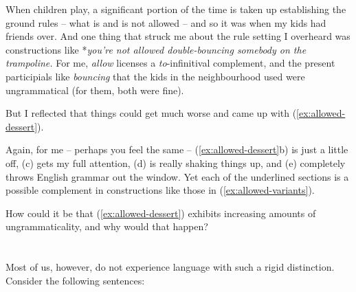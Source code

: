 When children play, a significant portion of the time is taken up establishing the ground rules -- what is and is not allowed -- and so it was when my kids had friends over. And one thing that struck me about the rule setting I overheard was constructions like *\textit{you're not allowed double-bouncing somebody on the trampoline.} For me, \textit{allow} licenses a \textit{to}-infinitival complement, and the present participials like \textit{bouncing} that the kids in the neighbourhood used were ungrammatical (for them, both were fine).

But I reflected that things could get much worse and came up with (\ref{ex:allowed-dessert}).

\ea \label{ex:allowed-dessert}
    \z
\z

Again, for me -- perhaps you feel the same -- (\ref{ex:allowed-dessert}b) is just a little off, (c) gets my full attention, (d) is really shaking things up, and (e) completely throws English grammar out the window. Yet each of the underlined sections is a possible complement in constructions like those in (\ref{ex:allowed-variants}).

\ea \label{ex:allowed-variants}
    \z
\z

How could it be that (\ref{ex:allowed-dessert}) exhibits increasing amounts of ungrammaticality, and why would that happen?


 

\section{}
Most of us, however, do not experience language with such a rigid distinction. Consider the following sentences:

\ea \label{ex:dog-gradience}
 \z
\z

